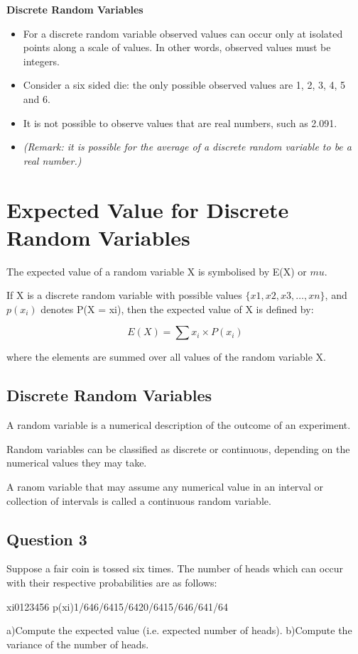\textbf{Discrete Random Variables}
\begin{itemize}
\item For a discrete random variable observed values can occur only at isolated points along a scale of values. In other words, observed values must be integers.
\item Consider a six sided die: the only possible observed values are 1, 2, 3, 4, 5 and 6. 
\item It is not possible to observe values that are real numbers, such as 2.091.

\item \textit{(Remark: it is possible for the average of a discrete random variable to be a real number.)}

\end{itemize}


\section{Expected Value for Discrete Random Variables}
The expected value of a random variable X is symbolised by E(X) or $mu$.


If X is a discrete random variable with possible values $\{ x1, x2, x3,\ldots , xn\}$, and$ p(x_i)$ denotes P(X = xi), then the expected value of X is defined by: 

\[E(X) = \sum x_i \times P(x_i) \]

where the elements are summed over all values of the random variable X. 


\subsection{Discrete Random Variables}

A random variable is a numerical description of the outcome of an experiment.

Random variables can be classified as discrete or continuous, depending on the numerical values they may take.

A ranom variable that may assume any numerical value in an interval or collection of intervals is called a continuous random variable.

\subsection{Question 3}

Suppose a fair coin is tossed six times. The number of heads which can occur with their respective
probabilities are as follows:

xi0123456
p(xi)1/646/6415/6420/6415/646/641/64

a)Compute the expected value (i.e. expected number of heads).
b)Compute the variance of the number of heads.





